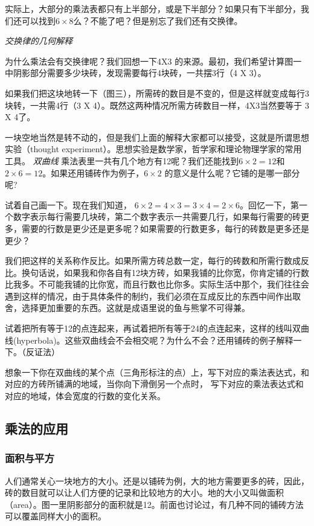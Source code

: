 实际上，大部分的乘法表都只有上半部分，或是下半部分？如果只有下半部分，我们还可以找到$6\times8$么？不能了吧？但是别忘了我们还有交换律。

\emph{交换律的几何解释}

为什么乘法会有交换律呢？我们回想一下4X3 的来源。最初，我们希望计算图一	中阴影部分需要多少块砖，发现需要每行4块砖，一共摆3行（4 X 3）。

如果我们把这块地转一下（图三），所需砖的数目是不变的，但是这样就变成每行3块转，一共需4行（3 X 4）。既然这两种情况所需方砖数目一样，4X3当然要等于 3 X 4了。

一块空地当然是转不动的，但是我们上面的解释大家都可以接受，这就是所谓思想实验（thought experiment）。思想实验是数学家，哲学家和理论物理学家的常用工具。
\emph{双曲线}
乘法表里一共有几个地方有12呢？我们还能找到$6\times2 = 12$和 $2\times6 = 12$。如果还用铺砖作为例子，$6\times2$ 的意义是什么呢？它铺的是哪一部分呢?

试着自己画一下。现在我们知道， $6\times2 = 4\times3 = 3\times4 = 2\times 6$。回忆一下，第一个数字表示每行需要几块砖，第二个数字表示一共需要几行，如果每行需要的砖更多，需要的行数是更少还是更多呢？如果需要的行数更多，每行的砖数是更多还是更少？

我们把这样的关系称作反比。如果所需方砖总数一定，每行的砖数和所需行数成反比。换句话说，如果我和你各自有12块方砖，如果我铺的比你宽，你肯定铺的行数比我多。不可能我铺的比你宽，而且行数也比你多。实际生活中那个，我们往往会遇到这样的情况，由于具体条件的制约，我们必须在互成反比的东西中间作出取舍，选择更加重要的东西。这就是成语里说的鱼与熊掌不可得兼。
 
 试着把所有等于12的点连起来，再试着把所有等于24的点连起来，这样的线叫双曲线(hyperbola)。这些双曲线会不会相交呢？为什么不会？还用铺砖的例子解释一下。（反证法）
 
想象一下你在双曲线的某个点（三角形标注的点）上，写下对应的乘法表达式，和对应的方砖所铺满的地域，当你向下滑倒另一个点时， 写下对应的乘法表达式和对应的地域，体会宽度的行数的变化关系。

\subsection{乘法的应用}
\subsubsection{面积与平方}
人们通常关心一块地方的大小。还是以铺砖为例，大的地方需要更多的砖，因此，砖的数目就可以让人们方便的记录和比较地方的大小。地的大小又叫做面积（area）。图一里阴影部分的面积就是12。前面也讨论过，有几种不同的铺砖方法可以覆盖同样大小的面积。

